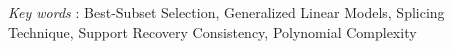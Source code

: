 \documentclass[12pt]{article}
\providecommand{\keywords}[1]{\textit{\quad Key words }:  #1}
\begin{document}
\keywords{Best-Subset Selection, Generalized Linear Models, Splicing Technique, Support Recovery Consistency, Polynomial Complexity}

\begingroup\renewcommand\thefootnote{*}
\begingroup\renewcommand\thefootnote{$\dagger$}






% 




\end{document}
